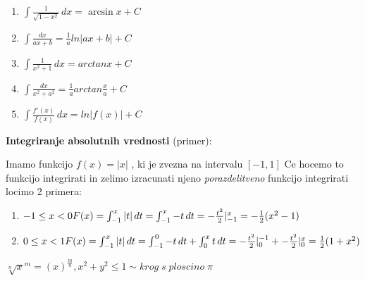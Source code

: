 \begin{center}
\begin{small}
\begin{enumerate}
			\item \begin{math}
				      \int {\frac{1}{\sqrt{1-x^2}}} \, dx = \arcsin {x} + C
			      \end{math}
			\item \begin{math}
				      \int \frac{dx}{ax + b} = \frac{1}{a} ln |ax + b| + C
			      \end{math}
			\item \begin{math}
				      \int \frac{1}{x^2 + 1} \, dx = arctan x + C
			      \end{math}
			\item \begin{math}
				      \int \frac{dx}{x^2 + a^2} = \frac{1}{a} arctan \frac{x}{a} + C
			      \end{math}
			\item \begin{math}
				      \int \frac{f'(x)}{f(x)} \, dx = ln|f(x)| + C
			      \end{math}
		\end{enumerate}
	\end{small}
\end{center}
\textbf{Integriranje absolutnih vrednosti} (primer):
\begin{small}
	Imamo funkcijo $f(x) = |x|$ , ki je zvezna na intervalu $[-1, 1]$
	Ce hocemo to funkcijo integrirati in zelimo izracunati njeno
	\textit{porazdelitveno} funkcijo integrirati locimo 2 primera:
\end{small}
\begin{enumerate}
	\item \begin{math}
		      -1 \leq x < 0\\
		      F(x) = \int_{-1}^x |t|\,dt = \int_{-1}^x -t\,dt = - \frac{t^2}{2} \rvert_{-1}^{x} = - \frac{1}{2} (x^2 -1)
	      \end{math}
	\item \begin{math}
		      0 \leq x < 1 \\
		      F(x) = \int_{-1}^x |t|\,dt = \int_{-1}^0 -t\,dt + \int_{0}^x t\,dt = - \frac{t^2}{2} \rvert_{0}^{-1} + - \frac{t^2}{2} \rvert_{0}^{x}= \frac{1}{2} (1 + x^2)
	      \end{math}
\end{enumerate}
\begin{small}
	\begin{math}
		\sqrt[n] x^m = (x)^{\frac{m}{n}}, x^2 + y^2 \leq 1 \sim krog\; s\; ploscino\; \pi
	\end{math}
\end{small}
